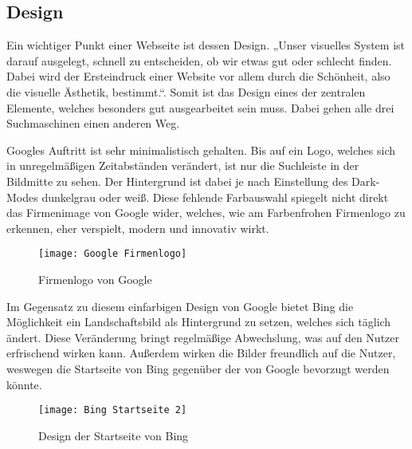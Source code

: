 \subsection{Design}
Ein wichtiger Punkt einer Webseite ist dessen Design. „Unser visuelles System ist darauf ausgelegt, schnell zu entscheiden,
ob wir etwas gut oder schlecht finden. Dabei wird der Ersteindruck einer Website vor allem durch die Schönheit, also die
visuelle Ästhetik, bestimmt.“\cite[Seite 43]{Thielsch.}.
Somit ist das Design eines der zentralen Elemente, welches besonders gut ausgearbeitet sein muss.
Dabei gehen alle drei Suchmaschinen einen anderen Weg.

Googles Auftritt ist sehr minimalistisch gehalten. Bis auf ein Logo, welches sich in unregelmäßigen Zeitabständen verändert,
ist nur die Suchleiste in der Bildmitte zu sehen. Der Hintergrund ist dabei je nach Einstellung des Dark-Modes dunkelgrau
oder weiß. Diese fehlende Farbauswahl spiegelt nicht direkt das Firmenimage von Google wider, welches, wie am Farbenfrohen
Firmenlogo zu erkennen, eher verspielt, modern und innovativ wirkt.
\begin{figure}[h]
    \centering
    \texttt{[image: Google Firmenlogo]}
    \caption{Firmenlogo von Google\cite{.2020}}
\end{figure}

Im Gegensatz zu diesem einfarbigen Design von Google bietet Bing die Möglichkeit ein Landschaftsbild als Hintergrund zu
setzen, welches sich täglich ändert. Diese Veränderung bringt regelmäßige Abwechslung, was auf den Nutzer erfrischend wirken
kann. Außerdem wirken die Bilder freundlich auf die Nutzer, weswegen die Startseite von Bing gegenüber der von Google
bevorzugt werden könnte.
\begin{figure}[h]
    \centering
    \texttt{[image: Bing Startseite 2]}
    \caption{Design der Startseite von Bing}
\end{figure}

